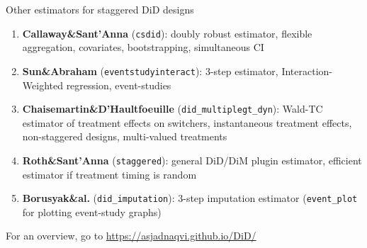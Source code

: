 \documentclass[aspectratio=169]{beamer}
\begin{document}
\begin{frame}{Other estimators for staggered DiD designs} \label{otherest} 
\begin{enumerate}
    \item \textbf{Callaway\&Sant'Anna} (\texttt{csdid}): doubly robust estimator, flexible aggregation, covariates, bootstrapping, simultaneous CI \medskip
    \item \textbf{Sun\&Abraham} (\texttt{eventstudyinteract}): 3-step estimator, Interaction-Weighted regression, event-studies  \medskip
    \item \textbf{Chaisemartin\&D'Haultfoeuille} (\texttt{did\_multiplegt\_dyn}):  Wald-TC estimator of treatment effects on switchers, instantaneous treatment effects, non-staggered designs, multi-valued treatments \medskip
    \item \textbf{Roth\&Sant'Anna} (\texttt{staggered}): general DiD/DiM plugin estimator, efficient estimator if treatment timing is random \medskip
    \item \textbf{Borusyak\&al.} (\texttt{did\_imputation}): 3-step imputation estimator (\texttt{event\_plot} for plotting event-study graphs)  \medskip
\end{enumerate}
For an overview, go to \href{https://asjadnaqvi.github.io/DiD/}{https://asjadnaqvi.github.io/DiD/}
\end{frame}
\end{document}

